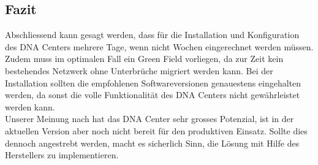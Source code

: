 \subsection{Fazit}
Abschliessend kann gesagt werden, dass für die Installation und Konfiguration des DNA Centers mehrere Tage, wenn nicht Wochen eingerechnet werden müssen. Zudem muss im optimalen Fall ein Green Field vorliegen, da zur Zeit kein bestehendes Netzwerk ohne Unterbrüche migriert werden kann. Bei der Installation sollten die empfohlenen Softwareversionen genauestens eingehalten werden, da sonst die volle Funktionalität des DNA Centers nicht gewährleistet werden kann. \\
Unserer Meinung nach hat das DNA Center sehr grosses Potenzial, ist in der aktuellen Version aber noch nicht bereit für den produktiven Einsatz. Sollte dies dennoch angestrebt werden, macht es sicherlich Sinn, die Lösung mit Hilfe des Herstellers zu implementieren.
